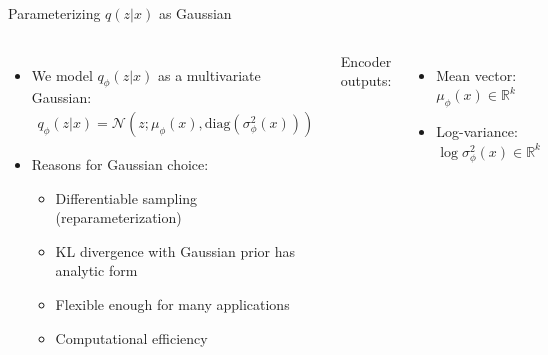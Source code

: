 \documentclass[5pt,aspectratio=169]{beamer}
\begin{document}
\begin{frame}{Parameterizing $q(z|x)$ as Gaussian}
  \begin{columns}
    \begin{itemize}
      \item We model $q_\phi(z|x)$ as a multivariate Gaussian:
        \begin{align}
          q_\phi(z|x) = \mathcal{N}(z; \mu_\phi(x), \text{diag}(\sigma^2_\phi(x)))
        \end{align}
      
      \item Reasons for Gaussian choice:
        \begin{itemize}
          \item Differentiable sampling (reparameterization)
          \item KL divergence with Gaussian prior has analytic form
          \item Flexible enough for many applications
          \item Computational efficiency
        \end{itemize}
      
    \end{itemize}
    
      
    Encoder outputs:
        \begin{itemize}
          \item Mean vector: $\mu_\phi(x) \in \mathbb{R}^k$
          \item Log-variance: $\log \sigma^2_\phi(x) \in \mathbb{R}^k$
        \end{itemize}
  \end{columns}
\end{frame}
\end{document}
